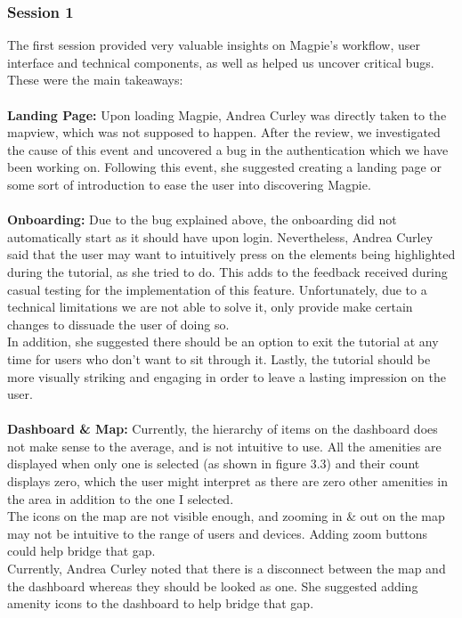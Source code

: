 \newpage
\subsubsection{Session 1}
The first session provided very valuable insights on Magpie's workflow, user interface and technical components, as well as helped us uncover critical bugs. These were the main takeaways:\\ \\
\textbf{Landing Page: }
Upon loading Magpie, Andrea Curley was directly taken to the map\-view, which was not supposed to happen. After the review, we investigated the cause of this event and uncovered a bug in the authentication which we have been working on. Following this event, she suggested creating a landing page or some sort of introduction to ease the user into discovering Magpie.\\ \\
\textbf{Onboarding: }
Due to the bug explained above, the onboarding did not automatically start as it should have upon login. Nevertheless, Andrea Curley said that the user may want to intuitively press on the elements being highlighted during the tutorial, as she tried to do. This adds to the feedback received during casual testing for the implementation of this feature. Unfortunately, due to a technical limitations we are not able to solve it, only provide make certain changes to dissuade the user of doing so.\\
In addition, she suggested there should be an option to exit the tutorial at any time for users who don't want to sit through it. Lastly, the tutorial should be more visually striking and engaging in order to leave a lasting impression on the user.\\ \\
\textbf{Dashboard \& Map: }
Currently, the hierarchy of items on the dashboard does not make sense to the average, and is not intuitive to use. All the amenities are displayed when only one is selected (as shown in figure 3.3) and their count displays zero, which the user might interpret as there are zero other amenities in the area in addition to the one I selected.\\
The icons on the map are not visible enough, and zooming in \& out on the map may not be intuitive to the range of users and devices. Adding zoom buttons could help bridge that gap. \\
Currently, Andrea Curley noted that there is a disconnect between the map and the dashboard whereas they should be looked as one. She suggested adding amenity icons to the dashboard to help bridge that gap.
